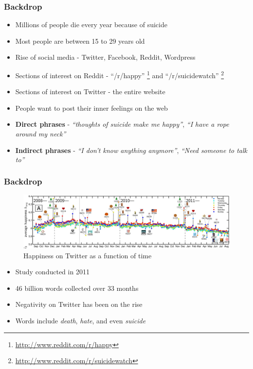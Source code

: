 \documentclass{beamer}
\begin{document}
    \begin{frame}
        \frametitle{Backdrop}
        \begin{itemize}
            \item{Millions of people die every year because of suicide}
            \item{Most people are between 15 to 29 years old}
            \item{Rise of social media - Twitter, Facebook, Reddit, Wordpress}
            \item{Sections of interest on Reddit - ``/r/happy'' \footnote{\url{http://www.reddit.com/r/happy}} and ``/r/suicidewatch'' \footnote{\url{http://www.reddit.com/r/suicidewatch}}}
            \item{Sections of interest on Twitter - the entire website}
            \item{People want to post their inner feelings on the web}
            \item{\textbf{Direct phrases} - \emph{``thoughts of suicide make me happy''}, \emph{``I have a rope around my neck''}}
            \item{\textbf{Indirect phrases} - \emph{``I don't know anything anymore''}, \emph{``Need someone to talk to''}}
        \end{itemize}
    \end{frame}
    
    \begin{frame}
        \frametitle{Backdrop}
        \begin{figure}
            \centering
            \includegraphics[width=\textwidth]{figures/twitter_happiness.png}
            \caption{Happiness on Twitter as a function of time}
        \end{figure}
        \begin{itemize}
            \item{Study conducted in 2011}
            \item{46 billion words collected over 33 months}
            \item{Negativity on Twitter has been on the rise}
            \item{Words include \emph{death}, \emph{hate}, and even \emph{suicide}}
        \end{itemize}
    \end{frame}
    
\end{document}
